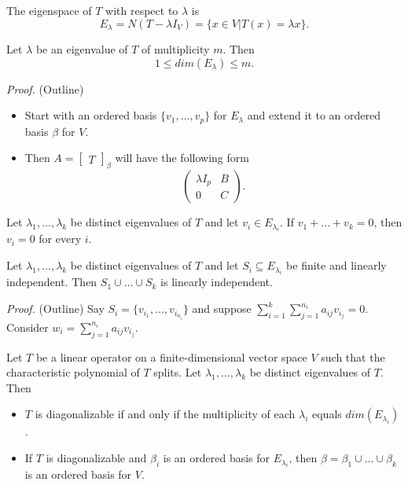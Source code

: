 \documentclass[12pt]{article}
\newenvironment{lemma}[2][Lemma]{\begin{trivlist}
\item[\hskip \labelsep {\bfseries #1}\hskip \labelsep {\bfseries #2.}]}{\end{trivlist}}
\newenvironment{theorem}[2][Theorem]{\begin{trivlist}
\item[\hskip \labelsep {\bfseries #1}\hskip \labelsep {\bfseries #2.}]}{\end{trivlist}}
\begin{document}
\noindent The eigenspace of $T$ with respect to $\lambda$ is $$E_\lambda = N(T - \lambda I_V) = \{x \in V | T(x) = \lambda x\}.$$

\begin{theorem}{5.7}
Let $\lambda$ be an eigenvalue of $T$ of multiplicity $m$. Then $$1 \leq dim(E_\lambda) \leq m.$$
\end{theorem}

\textit{Proof.} (Outline)
\begin{itemize}
    \item Start with an ordered basis $\{v_1, \dots, v_p\}$ for $E_\lambda$ and extend it to an ordered basis $\beta$ for $V$.
    
    \item Then $A = \begin{bmatrix} T \end{bmatrix}_\beta$ will have the following form $$\begin{pmatrix}
    \lambda I_p & B \\ 0 & C
    \end{pmatrix}.$$
\end{itemize}

\begin{lemma}{9}
Let $\lambda_1, \dots, \lambda_k$ be distinct eigenvalues of $T$ and let $v_i \in E_{\lambda_i}$. If $v_1 + \dots + v_k = 0$, then $v_i = 0$ for every $i$.
\end{lemma}

\begin{theorem}{5.8}
Let $\lambda_1, \dots, \lambda_k$ be distinct eigenvalues of $T$ and let $S_i \subseteq E_{\lambda_i}$ be finite and linearly independent. Then $S_1 \cup \dots \cup S_k$ is linearly independent.
\end{theorem}

\textit{Proof.} (Outline)
Say $S_i = \{v_{i_1}, \dots, v_{i_{n_i}}\}$ and suppose $\sum_{i = 1}^k\sum_{j = 1}^{n_i}a_{ij}v_{i_j} = 0$. Consider $w_i = \sum_{j = 1}^{n_i}a_{ij}v_{i_j}$.

\begin{theorem}{5.9}
Let $T$ be a linear operator on a finite-dimensional vector space $V$ such that the characteristic polynomial of $T$ splits. Let $\lambda_1, \dots, \lambda_k$ be distinct eigenvalues of $T$. Then

\begin{itemize}
    \item[(a)] $T$ is diagonalizable if and only if the multiplicity of each $\lambda_i$ equals $dim(E_{\lambda_i})$.
    
    \item[(b)] If $T$ is diagonalizable and $\beta_i$ is an ordered basis for $E_{\lambda_i}$, then $\beta = \beta_1 \cup \dots \cup \beta_k$ is an ordered basis for $V$.
\end{itemize}
\end{theorem}
\end{document}
